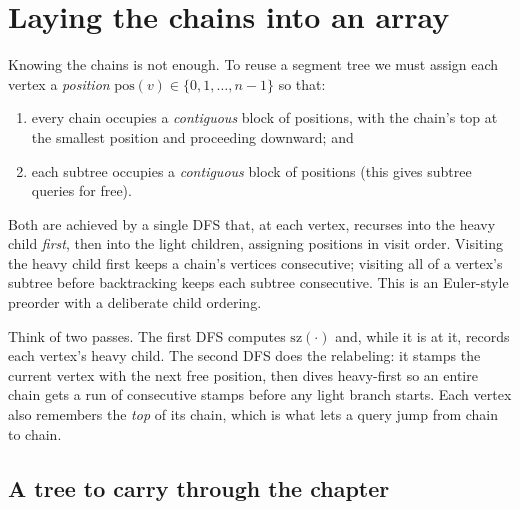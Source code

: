 \section{Laying the chains into an array}
\label{ch19:layout}

Knowing the chains is not enough. To reuse a segment tree we must assign each vertex a
\emph{position} $\mathrm{pos}(v)\in\{0,1,\dots,n-1\}$ so that:

\begin{enumerate}
  \item every chain occupies a \emph{contiguous} block of positions, with the chain's top at the
        smallest position and proceeding downward; and
  \item each subtree occupies a \emph{contiguous} block of positions (this gives subtree queries for
        free).
\end{enumerate}

Both are achieved by a single DFS that, at each vertex, recurses into the heavy child \emph{first},
then into the light children, assigning positions in visit order. Visiting the heavy child first keeps
a chain's vertices consecutive; visiting all of a vertex's subtree before backtracking keeps each
subtree consecutive. This is an Euler-style preorder with a deliberate child ordering.

\begin{intuitionbox}
Think of two passes. The first DFS computes $\mathrm{sz}(\cdot)$ and, while it is at it, records each
vertex's heavy child. The second DFS does the relabeling: it stamps the current vertex with the next
free position, then dives heavy-first so an entire chain gets a run of consecutive stamps before any
light branch starts. Each vertex also remembers the \emph{top} of its chain, which is what lets a
query jump from chain to chain.
\end{intuitionbox}

\subsection{A tree to carry through the chapter}

